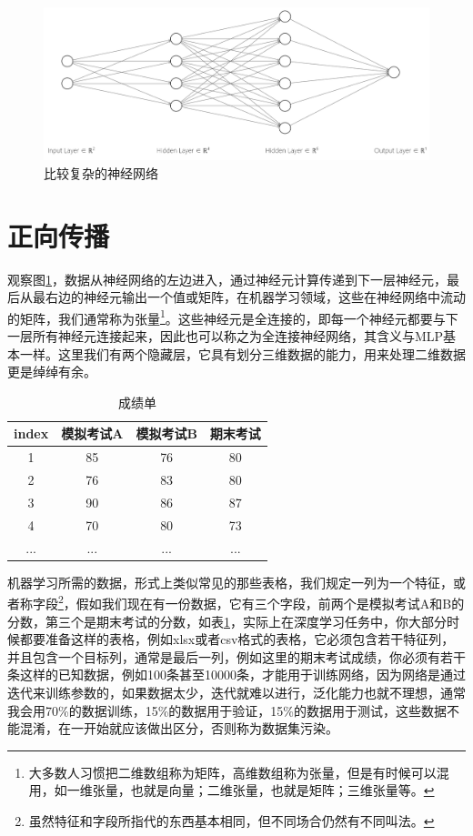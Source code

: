 \documentclass[a5paper, 11pt]{ctexbook}
\begin{document}
\begin{figure}[ht]
    \centering
    \includegraphics[width=\textwidth]{figures/复杂神经网络.png}
    \caption{比较复杂的神经网络}
    \label{figure4}
\end{figure}

\section{正向传播}

观察图\ref{figure4}，数据从神经网络的左边进入，通过神经元计算传递到下一层神经元，最后从最右边的神经元输出一个值或矩阵，在机器学习领域，这些在神经网络中流动的矩阵，我们通常称为张量\footnote{大多数人习惯把二维数组称为矩阵，高维数组称为张量，但是有时候可以混用，如一维张量，也就是向量；二维张量，也就是矩阵；三维张量等。}。这些神经元是全连接的，即每一个神经元都要与下一层所有神经元连接起来，因此也可以称之为全连接神经网络，其含义与MLP基本一样。这里我们有两个隐藏层，它具有划分三维数据的能力，用来处理二维数据更是绰绰有余。

\begin{table}[ht]
    \centering
    \caption{成绩单}
    \begin{tabular}{c c c c}
        index & 模拟考试A & 模拟考试B & 期末考试 \\ \hline
        1     & 85    & 76    & 80   \\
        2     & 76    & 83    & 80   \\
        3     & 90    & 86    & 87   \\
        4     & 70    & 80    & 73   \\
        ...   & ...   & ...   & ...
    \end{tabular}
    \label{table1}
\end{table}

机器学习所需的数据，形式上类似常见的那些表格，我们规定一列为一个特征，或者称字段\footnote{虽然特征和字段所指代的东西基本相同，但不同场合仍然有不同叫法。}，假如我们现在有一份数据，它有三个字段，前两个是模拟考试A和B的分数，第三个是期末考试的分数，如表\ref{table1}，实际上在深度学习任务中，你大部分时候都要准备这样的表格，例如xlsx或者csv格式的表格，它必须包含若干特征列，并且包含一个目标列，通常是最后一列，例如这里的期末考试成绩，你必须有若干条这样的已知数据，例如100条甚至10000条，才能用于训练网络，因为网络是通过迭代来训练参数的，如果数据太少，迭代就难以进行，泛化能力也就不理想，通常我会用70\%的数据训练，15\%的数据用于验证，15\%的数据用于测试，这些数据不能混淆，在一开始就应该做出区分，否则称为数据集污染。
\end{document}
